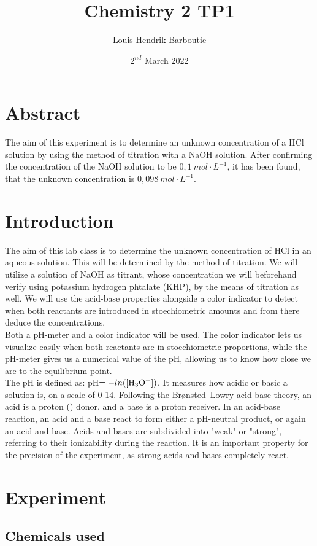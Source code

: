 \documentclass[twocolumn]{article}
\title{Chemistry 2 TP1}
\author{Louis-Hendrik Barboutie}
\date{$2^{nd}$ March 2022}
\begin{document}
\maketitle

\onecolumn
\tableofcontents
\twocolumn

\clearpage
\section{Abstract}
The aim of this experiment is to determine an unknown concentration of a HCl solution by using the method of titration with a NaOH solution. After confirming the concentration of the NaOH solution to be $0,1 \ mol \cdot L^{-1}$, it has been found, that the unknown concentration is $0,098 \ mol \cdot L^{-1}$.
\section{Introduction}
The aim of this lab class is to determine the unknown concentration of HCl in an aqueous solution. This will be determined by the method of titration. We will utilize a solution of NaOH as titrant, whose concentration we will beforehand verify using potassium hydrogen phtalate (KHP), by the means of titration as well. We will use the acid-base properties alongside a color indicator to detect when both reactants are introduced in stoechiometric amounts and from there deduce the concentrations.\\
Both a pH-meter and a color indicator will be used. The color indicator lets us visualize easily when both reactants are in stoechiometric proportions, while the pH-meter gives us a numerical value of the pH, allowing us to know how close we are to the equilibrium point.\\
The pH is defined as: pH$=-ln([\ce{H3O+}])$. It measures how acidic or basic a solution is, on a scale of 0-14. Following the Brønsted–Lowry acid-base theory, an acid is a proton () donor, and a base is a proton receiver. In an acid-base reaction, an acid and a base react to form either a pH-neutral product, or again an acid and base. Acids and bases are subdivided into "weak" or "strong", referring to their ionizability during the reaction. It is an important property for the precision of the experiment, as strong acids and bases completely react.
\section{Experiment}
\subsection{Chemicals used}
\end{document}
